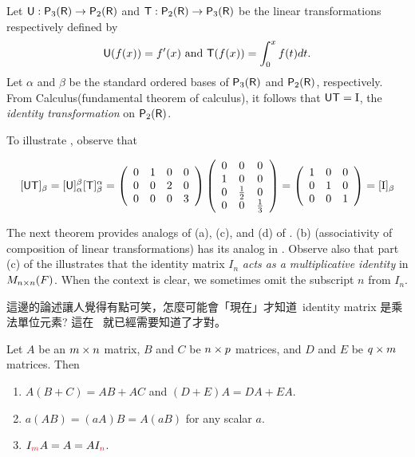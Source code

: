 \begin{example} \label{example 2.3.2}
Let \(\textsf{U}: \textsf{P}_3(\textsf{R}) \to \textsf{P}_2(\textsf{R})\) and \(\textsf{T}: \textsf{P}_2(\textsf{R}) \to \textsf{P}_3(\textsf{R})\) be the linear transformations respectively defined by
\[
    \textsf{U}(f(x)) = f'(x) \text{ and } \textsf{T}(f(x)) = \int_0^x f(t) dt.
\]
Let \(\alpha\) and \(\beta\) be the standard ordered bases of \(\textsf{P}_3(\textsf{R})\) and \(\textsf{P}_2(\textsf{R})\), respectively.
From Calculus(fundamental theorem of calculus), it follows that \(\textsf{U}\textsf{T} = \mathrm{I}\), the \emph{identity transformation} on \(\textsf{P}_2(\textsf{R})\).

To illustrate , observe that

\[
    [\textsf{U}\textsf{T}]_{\beta} = [\textsf{U}]_{\alpha}^{\beta}[\textsf{T}]_{\beta}^{\alpha}
    =\left(\begin{array}{cccc}
        0 & 1 & 0 & 0 \\
        0 & 0 & 2 & 0 \\
        0 & 0 & 0 & 3
    \end{array}\right)
    \left(\begin{array}{ccc}
        0 & 0 & 0 \\
        1 & 0 & 0 \\
        0 & \frac{1}{2} & 0 \\
        0 & 0 & \frac{1}{3}
    \end{array}\right)
    =\left(\begin{array}{ccc}
        1 & 0 & 0 \\
        0 & 1 & 0 \\
        0 & 0 & 1
    \end{array}\right)
    =[\mathrm{I}]_{\beta}
\]
\end{example}

The next theorem provides analogs of (a), (c), and (d) of .
(b) (associativity of composition of linear transformations) has its analog in .
Observe also that part (c) of the  illustrates that the identity matrix \(I_n\) \emph{acts as a multiplicative identity} in \(M_{n \times n}(F)\).
When the context is clear, we sometimes omit the subscript \(n\) from \(I_n\).

\begin{note}
這邊的論述讓人覺得有點可笑，怎麼可能會「現在」才知道\ identity matrix 是乘法單位元素? 這在\  就已經需要知道了才對。
\end{note}

\begin{theorem} \label{thm 2.12}
Let \(A\) be an \(m \times n\) matrix, \(B\) and \(C\) be \(n \times p\) matrices, and \(D\) and \(E\) be \(q \times m\) matrices.
Then
\begin{enumerate}
\item \(A(B + C) = AB + AC\) and \((D + E)A = DA + EA\).
\item \(a(AB) = (aA)B = A(aB)\) for any scalar \(a\).
\item \(I_{\RED{m}}A = A = AI_{\RED{n}}\).
\end{enumerate}
\end{theorem}

